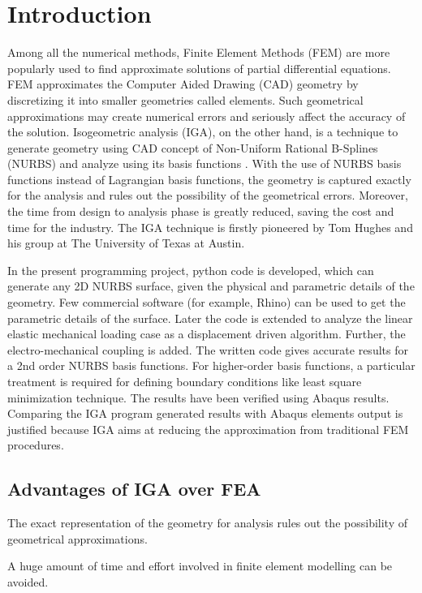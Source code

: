 \documentclass[11pt]{article}
\begin{document}
\clearpage

\newpage
\clearpage
\tableofcontents
\clearpage

\vspace*{1cm}

\section{Introduction}
Among all the numerical methods, Finite Element Methods (FEM) are more popularly used to find approximate solutions of partial differential equations. FEM approximates the Computer Aided Drawing (CAD) geometry by discretizing it into smaller geometries called elements. Such geometrical approximations may create numerical errors and seriously affect the accuracy of the solution. Isogeometric analysis (IGA), on the other hand, is a technique to generate geometry using CAD concept of Non-Uniform Rational B-Splines (NURBS) and analyze using its basis functions \cite{agrawal2019iga}. With the use of NURBS basis functions instead of Lagrangian basis functions, the geometry is captured exactly for the analysis and rules out the possibility of the geometrical errors. Moreover, the time from design to analysis phase is greatly reduced, saving the cost and time for the industry. The IGA technique is firstly pioneered by Tom Hughes and his group at The University of Texas at Austin.\\
\par
In the present programming project, python code is developed, which can generate any 2D NURBS surface, given the physical and parametric details of the geometry. Few commercial software (for example, Rhino) can be used to get the parametric details of the surface. Later the code is extended to analyze the linear elastic mechanical loading case as a displacement driven algorithm. Further, the electro-mechanical coupling is added. The written code gives accurate results for a 2nd order NURBS basis functions. For higher-order basis functions, a particular treatment is required for defining boundary conditions like least square minimization technique. The results have been verified using Abaqus results. Comparing the IGA program generated results with Abaqus elements output is justified because IGA aims at reducing the approximation from traditional FEM procedures.    

\subsection{Advantages of IGA over FEA}
\begin{description}[leftmargin=*]
	\item[$\bullet$]   The exact representation of the geometry for analysis rules
	out the possibility of geometrical approximations.
	\item[$\bullet$]   A huge amount of time and effort involved in finite element modelling
	can be avoided.
\end{description}
\end{document}
